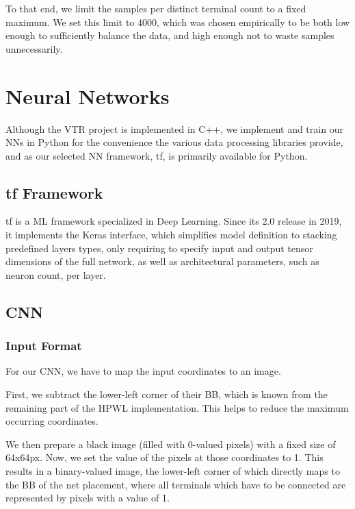 To that end, we limit the samples per distinct terminal count to a fixed maximum. We set this limit to 4000, which was chosen empirically to be both low enough to sufficiently balance the data, and high enough not to waste samples unnecessarily.

\section{Neural Networks}

Although the \gls{VTR} project is implemented in C++, we implement and train our \glspl{NN} in Python for the convenience the various data processing libraries provide, and as our selected \gls{NN} framework, \gls{tf}, is primarily available for Python.

\subsection{\gls{tf} Framework}

\gls{tf} is a \gls{ML} framework specialized in Deep Learning.\cite{tensorflow2015-whitepaper} Since its 2.0 release in 2019, it implements the Keras interface\cite{chollet2015keras}, which simplifies model definition to stacking predefined layers types, only requiring to specify input and output tensor dimensions of the full network, as well as architectural parameters, such as neuron count, per layer.

\subsection{\gls{CNN}}



\subsubsection{Input Format}

For our \gls{CNN}, we have to map the input coordinates to an image. 

First, we subtract the lower-left corner of their \gls{BB}, which is known from the remaining part of the \gls{HPWL} implementation. This helps to reduce the maximum occurring coordinates.

We then prepare a black image (filled with 0-valued pixels) with a fixed size of 64x64px\cite{TODO}. Now, we set the value of the pixels at those coordinates to 1. This results in a binary-valued image, the lower-left corner of which directly maps to the \gls{BB} of the net placement, where all terminals which have to be connected are represented by pixels with a value of 1.

